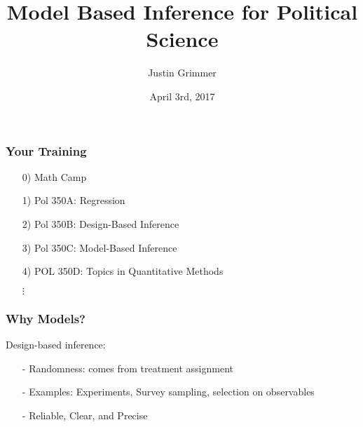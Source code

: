 \documentclass{beamer}
\title[PS 350c] %
{Model Based Inference for Political Science}
\author[Grimmer]{Justin Grimmer}
\institute[Stanford University]{Associate Professor\\
Department of Political Science\\
Stanford University}
\date{April 3rd, 2017}%
\begin{document}
\begin{frame}
\titlepage
\end{frame}


\begin{frame}

\end{frame}


\begin{frame}
\frametitle{Your Training}
\begin{itemize}
\item[0)] Math Camp
\item[1)] Pol 350A: Regression
\item[2)] Pol 350B: Design-Based Inference
\item[3)] \alert{Pol 350C: Model-Based Inference}
\item[4)] POL 350D: Topics in Quantitative Methods
\item[] $\vdots$
\end{itemize}

\end{frame}




\begin{frame}
\frametitle{Why Models?}

Design-based inference:
\begin{itemize}
\item[-] Randomness: comes from treatment assignment
\item[-] Examples: Experiments, Survey sampling, selection on observables
\item[-] Reliable, Clear, and Precise
\end{itemize}

\end{frame}
\end{document}
